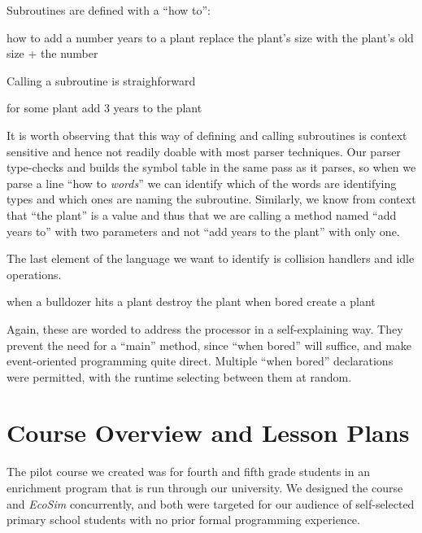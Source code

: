 \documentclass{sig-alternate}
\newcommand{\INDSTATE}[1][1]{\STATE\hspace{#1\algorithmicindent}}
\newenvironment{snippet}{\begin{algorithmic}[1]}{\end{algorithmic}}
\begin{document}
Subroutines are defined with a ``how to'':
\begin{snippet}
\STATE how to add a number years to a plant
\INDSTATE replace the plant's size with the plant's old size + the number
\end{snippet}
Calling a subroutine is straighforward
\begin{snippet}
\STATE for some plant
\INDSTATE add 3 years to the plant
\end{snippet}
It is worth observing that this way of defining and calling subroutines
is context sensitive and hence not readily doable with most parser techniques.
Our parser type-checks and builds the symbol table in the same pass as it parses,
so when we parse a line ``how to \emph{words}''
we can identify which of the words are identifying types
and which ones are naming the subroutine.
Similarly, we know from context that ``the plant'' is a value
and thus that we are calling a method named ``add years to'' with two parameters
and not ``add years to the plant'' with only one.

The last element of the language we want to identify
is collision handlers and idle operations.
\begin{snippet}
\STATE when a bulldozer hits a plant
\INDSTATE destroy the plant
\STATE when bored
\INDSTATE create a plant
\end{snippet}
Again, these are worded to address the processor in a self-explaining way.
They prevent the need for a ``main'' method, since ``when bored'' will suffice,
and make event-oriented programming quite direct.
Multiple ``when bored'' declarations were permitted,
with the runtime selecting between them at random.


\section{Course Overview and Lesson Plans}
The pilot course we created was for fourth and fifth grade students in an enrichment program
that is run through our university.  We designed the course and \emph{EcoSim} concurrently,
and both were targeted for our audience of self-selected primary school students with no
prior formal programming experience.
\end{document}
